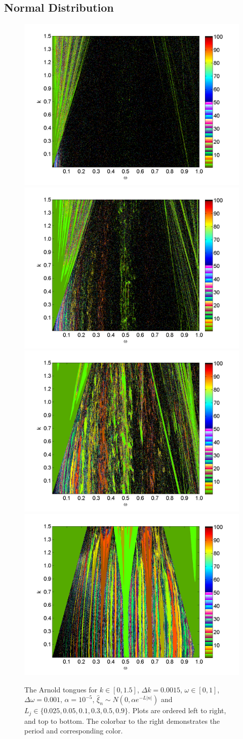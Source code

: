 \subsection{Normal Distribution}
\begin{figure}[H]\linespread{1}  
\caption[The Arnold tongues for the random circle map, normal distribution]{The Arnold
  tongues for $k\in [0,1.5]$, $\Delta k = 0.0015$, $\omega \in [0,1]$,
  $\Delta \omega = 0.001$, $\alpha = 10^{-5}$, $\hat{\xi}_n\sim
  N(0,\alpha e^{-L|n|})$ and $L_j \in
  \{0.025,0.05,0.1,0.3,0.5,0.9\}$. Plots are ordered left to right, and top to bottom. The colorbar
to the right demonstrates the period and corresponding color.}\label{fig:rcirctongues_n}
\centering
\includegraphics[width=.5\textwidth]{figs/tongues_norm_1000_L_0025.png}\hfill
\includegraphics[width=.5\textwidth]{figs/tongues_norm_1000_L_005.png}\\
\includegraphics[width=.5\textwidth]{figs/tongues_norm_1000_L_01.png}\hfill
\includegraphics[width=.5\textwidth]{figs/tongues_norm_1000_L_03.png}\\

\end{figure}
